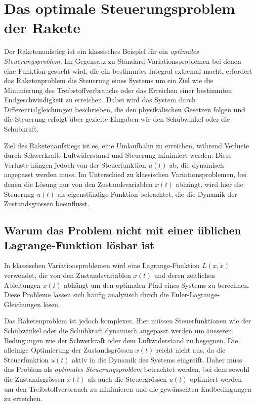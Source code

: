%
%
%
%

\section{Das optimale Steuerungsproblem der Rakete \label{leo:section:optimalsteuerung}}

Der Raketenaufstieg ist ein klassisches Beispiel für ein \textit{optimales Steuerungsproblem}. 
Im Gegensatz zu Standard-Variationsproblemen bei denen eine Funktion gesucht wird, die ein bestimmtes Integral extremal macht, erfordert das Raketenproblem die Steuerung eines Systems um ein Ziel wie die Minimierung des Treibstoffverbrauchs oder das Erreichen einer bestimmten Endgeschwindigkeit zu erreichen. Dabei wird das System durch Differentialgleichungen beschrieben, die den physikalischen Gesetzen folgen und die Steuerung erfolgt über gezielte Eingaben wie den Schubwinkel oder die Schubkraft.

Ziel des Raketenaufstiegs ist es, eine Umlaufbahn zu erreichen, während Verluste durch Schwerkraft, Luftwiderstand und Steuerung minimiert werden. 
Diese Verluste hängen jedoch von der Steuerfunktion \( u(t) \) ab, die dynamisch angepasst werden muss. 
Im Unterschied zu klassischen Variationsproblemen, bei denen die Lösung nur von den Zustandsvariablen \( x(t) \) abhängt, wird hier die Steuerung \( u(t) \) als eigenständige Funktion betrachtet, die die Dynamik der Zustandsgrössen beeinflusst.

\subsection{Warum das Problem nicht mit einer üblichen Lagrange-Funktion lösbar ist}

In klassischen Variationsproblemen wird eine Lagrange-Funktion \(L(x, \dot{x})\) verwendet, die von den Zustandsvariablen \(x(t)\) und deren zeitlichen Ableitungen \(\dot{x}(t)\) abhängt um den optimalen Pfad eines Systems zu berechnen. 
Diese Probleme lassen sich häufig analytisch durch die Euler-Lagrange-Gleichungen lösen.

Das Raketenproblem ist jedoch komplexer. 
Hier müssen Steuerfunktionen wie der Schubwinkel oder die Schubkraft dynamisch angepasst werden um äusseren Bedingungen wie der Schwerkraft oder dem Luftwiderstand zu begegnen. 
Die alleinige Optimierung der Zustandsgrössen \(x(t)\) reicht nicht aus, da die Steuerfunktion \(u(t)\) aktiv in die Dynamik des Systems eingreift. 
Daher muss das Problem als \textit{optimales Steuerungsproblem} betrachtet werden, bei dem sowohl die Zustandsgrössen \(x(t)\) als auch die Steuergrössen \(u(t)\) optimiert werden um den Treibstoffverbrauch zu minimieren und die gewünschten Endbedingungen zu erreichen.

